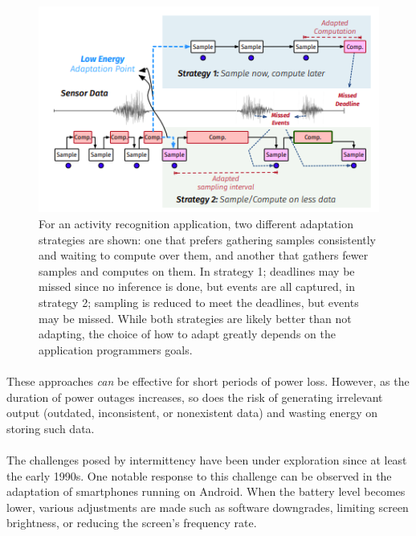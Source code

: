         
    \begin{figure}[htbp]
        \centering
        \includegraphics[width=1\textwidth]{img/chap2/Figure - different strategies.png}
        \caption{For an activity recognition application, two different adaptation strategies are shown: one that prefers gathering samples consistently and waiting to  compute over them, and another that gathers fewer samples and computes on them. In strategy 1; deadlines may be missed since no inference is done, but events are all captured, in strategy 2; sampling is reduced to meet the deadlines, but events may be missed. While both strategies are likely better than not adapting, the choice of how to adapt greatly depends on the application programmers goals.\cite{10.1145/3478077}}
        \label{fig:energyadaptivestrategies}
    \end{figure}

    \paragraph{}
        These approaches \textit{can} be effective for short periods of power loss. However, as the duration of power outages increases, so does the risk of generating irrelevant output (outdated, inconsistent, or nonexistent data) and wasting energy on storing such data\cite{basedArticle}.



    \paragraph{}
        The challenges posed by intermittency have been under exploration since at least the early 1990s\cite{259428}. One notable response to this challenge can be observed in the adaptation of smartphones running on Android\cite{10.5555/2813767.2813810}. When the battery level becomes lower, various adjustments are made such as software downgrades, limiting screen brightness, or reducing the screen's frequency rate\cite{basedArticle}.

